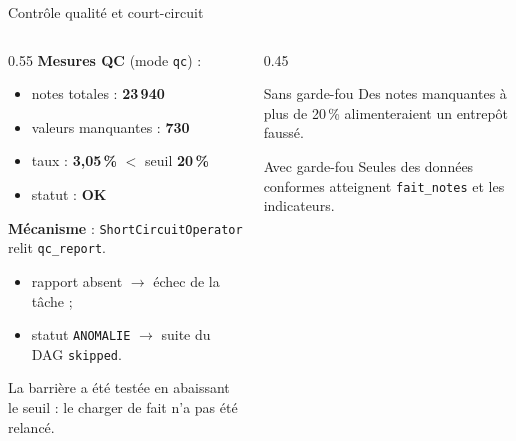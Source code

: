 \documentclass[10pt]{beamer}
\begin{document}
\begin{frame}{Contrôle qualité et court-circuit}
  \begin{columns}
    \begin{column}{0.55\textwidth}
      \textbf{Mesures QC} (mode \texttt{qc}) :
      \begin{itemize}
        \item notes totales : \textbf{23\,940}
        \item valeurs manquantes : \textbf{730}
        \item taux : \textbf{3{,}05\,\%} $<$ seuil \textbf{20\,\%}
        \item statut : \textbf{OK}
      \end{itemize}
      \vspace{0.4em}
      \textbf{Mécanisme} : \texttt{ShortCircuitOperator} relit \texttt{qc\_report}.
      \begin{itemize}
        \item rapport absent $\rightarrow$ échec de la tâche ;
        \item statut \texttt{ANOMALIE} $\rightarrow$ suite du DAG \texttt{skipped}.
      \end{itemize}
      \vspace{0.4em}
      La barrière a été testée en abaissant le seuil : le charger de fait n'a pas été
      relancé.
    \end{column}
    \begin{column}{0.45\textwidth}
      \begin{alertblock}{Sans garde-fou}
        Des notes manquantes à plus de 20\,\% alimenteraient un entrepôt faussé.
      \end{alertblock}
      \begin{block}{Avec garde-fou}
        Seules des données conformes atteignent \texttt{fait\_notes} et les indicateurs.
      \end{block}
    \end{column}
  \end{columns}
\end{frame}
\end{document}
